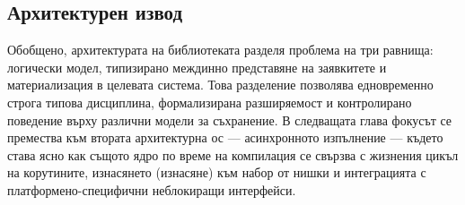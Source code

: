 \subsection{Архитектурен извод}

Обобщено, архитектурата на библиотеката разделя проблема на три равнища: логически модел, типизирано междинно представяне на заявкитете и материализация в целевата система. Това разделение позволява едновременно строга типова дисциплина, формализирана разширяемост и контролирано поведение върху различни модели за съхранение. В следващата глава фокусът се премества към втората архитектурна ос --- асинхронното изпълнение --- където става ясно как същото ядро по време на компилация се свързва с жизнения цикъл на корутините, изнасянето (изнасяне) към набор от нишки и интеграцията с платформено-специфични неблокиращи интерфейси.
